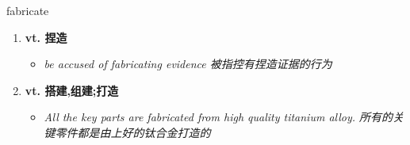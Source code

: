 
\begin{frame}
{\huge fabricate}
\begin{center}
\begin{enumerate}\Large
  \item \textbf{vt. 捏造}
  \begin{itemize}
    \item \em{\Large{be accused of fabricating evidence 被指控有捏造证据的行为}}
  \end{itemize}
  \item \textbf{vt. 搭建,组建;打造}
  \begin{itemize}
    \item \em{\Large{All the key parts are fabricated from high quality titanium alloy. 所有的关键零件都是由上好的钛合金打造的}}
  \end{itemize}
\end{enumerate}
\end{center}
\end{frame}
